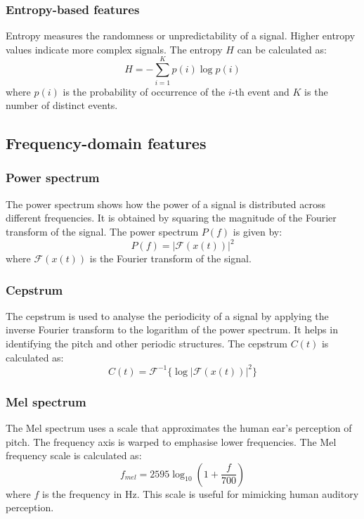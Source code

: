 \subsubsection{Entropy-based features}
Entropy measures the randomness or unpredictability of a signal. Higher entropy values indicate more complex signals. The entropy $ H $ can be calculated as:
\begin{equation} H = - \sum_{i=1}^{K} p(i) \log p(i) \end{equation}
where $ p(i) $ is the probability of occurrence of the $ i $-th event and $ K $ is the number of distinct events.

\subsection{Frequency-domain features}

\subsubsection{Power spectrum}
The power spectrum shows how the power of a signal is distributed across different frequencies. It is obtained by squaring the magnitude of the Fourier transform of the signal. The power spectrum $ P(f) $ is given by:
\begin{equation} P(f) = | \mathcal{F}(x(t)) |^2 \end{equation}
where $ \mathcal{F}(x(t)) $ is the Fourier transform of the signal.

\subsubsection{Cepstrum}
The cepstrum is used to analyse the periodicity of a signal by applying the inverse Fourier transform to the logarithm of the power spectrum. It helps in identifying the pitch and other periodic structures. The cepstrum $ C(t) $ is calculated as:
\begin{equation} C(t) = \mathcal{F}^{-1} \{ \log | \mathcal{F}(x(t)) |^2 \} \end{equation}

\subsubsection{Mel spectrum}
The Mel spectrum uses a scale that approximates the human ear's perception of pitch. The frequency axis is warped to emphasise lower frequencies. The Mel frequency scale is calculated as:
\begin{equation}
f_{mel} = 2595 \log_{10} \left( 1 + \frac{f}{700} \right)
\end{equation}
where $ f $ is the frequency in Hz. This scale is useful for mimicking human auditory perception.

